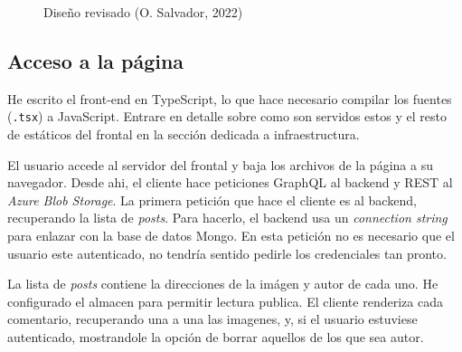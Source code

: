 \documentclass[11pt]{article}
\begin{document}
\begin{flushleft}
	\begin{figure}[htb]
		\centering
		\caption{Diseño revisado (O. Salvador, 2022)}
		\label{alto_nivel}
	\end{figure}


	\subsection{Acceso a la página}
	He escrito el front-end en TypeScript, lo que hace necesario compilar los fuentes (\texttt{.tsx}) a JavaScript. Entrare en detalle sobre como son servidos estos y el resto de estáticos del frontal en la sección dedicada a infraestructura. 
	\linebreak
	
	El usuario accede al servidor del frontal y baja los archivos de la página a su navegador. Desde ahi, el cliente hace peticiones GraphQL al backend y REST al \textit{Azure Blob Storage}. La primera petición que hace el cliente es al backend, recuperando la lista de \textit{posts}. Para hacerlo, el backend usa un \textit{connection string} para enlazar con la base de datos Mongo. En esta petición no es necesario que el usuario este autenticado, no tendría sentido pedirle los credenciales tan pronto. 
	\linebreak
	
	La lista de \textit{posts} contiene la direcciones de la imágen y autor de cada uno. He configurado el almacen para permitir lectura publica. El cliente renderiza cada comentario, recuperando una a una las imagenes, y, si el usuario estuviese autenticado, mostrandole la opción de borrar aquellos de los que sea autor.
	\linebreak
	

\end{flushleft}
\end{document}
